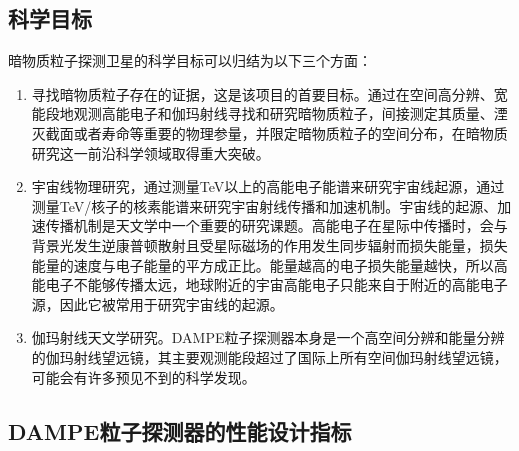 \subsection{科学目标}
暗物质粒子探测卫星的科学目标可以归结为以下三个方面：
\begin{enumerate}
	\item 寻找暗物质粒子存在的证据，这是该项目的首要目标。通过在空间高分辨、宽能段地观测高能电子和伽玛射线寻找和研究暗物质粒子，间接测定其质量、湮灭截面或者寿命等重要的物理参量，并限定暗物质粒子的空间分布，在暗物质研究这一前沿科学领域取得重大突破。
	\item 宇宙线物理研究，通过测量TeV以上的高能电子能谱来研究宇宙线起源，通过测量TeV/核子的核素能谱来研究宇宙射线传播和加速机制。宇宙线的起源、加速传播机制是天文学中一个重要的研究课题。高能电子在星际中传播时，会与背景光发生逆康普顿散射且受星际磁场的作用发生同步辐射而损失能量，损失能量的速度与电子能量的平方成正比。能量越高的电子损失能量越快，所以高能电子不能够传播太远，地球附近的宇宙高能电子只能来自于附近的高能电子源，因此它被常用于研究宇宙线的起源。
	\item 伽玛射线天文学研究。DAMPE粒子探测器本身是一个高空间分辨和能量分辨的伽玛射线望远镜，其主要观测能段超过了国际上所有空间伽玛射线望远镜，可能会有许多预见不到的科学发现。
\end{enumerate}

    
\subsection{DAMPE粒子探测器的性能设计指标}

